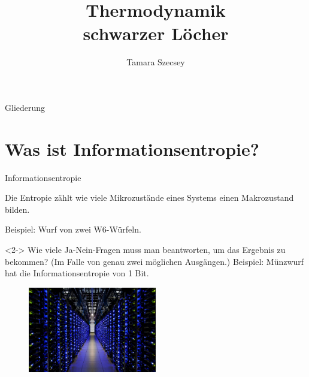 \documentclass[ngerman,ph]{URbeamer}
\title{Thermodynamik \\schwarzer Löcher}
\institute{Fakultät für Physik}
\author{Tamara Szecsey}
\begin{document}
	\frame[plain]{\titlepage}
	
	\begin{frame}{Gliederung}
		\tableofcontents
	\end{frame}
	
	\section{Was ist Informationsentropie?}
	\begin{frame}{Informationsentropie}
		\begin{block}{}
			Die Entropie zählt wie viele Mikrozustände eines Systems einen Makrozustand bilden. 
			
			Beispiel: Wurf von zwei W6-Würfeln.
		\end{block}
		
		\begin{block}{}<2->
		Wie viele Ja-Nein-Fragen muss man beantworten, um das Ergebnis zu bekommen?
		(Im Falle von genau zwei möglichen Ausgängen.)
		Beispiel: Münzwurf hat die Informationsentropie von 1 Bit.	
		\end{block}
		\begin{figure} [h] 
			\begin{center}
				\includegraphics[width=0.5\textwidth]{Server}
			\end{center}
		\end{figure} 	 	%
		\hfill
	\end{frame}
	
\end{document}
